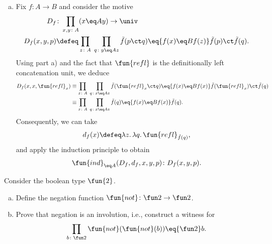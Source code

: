 \begin{solution}
\begin{enumerate}[a)]
        \item Fix $f\colon A\to B$ and consider the motive
        \begin{align*}
            D_f&\colon\prod_{x,y\colon A}(x\eq Ay)\to\univ\\
                D_f(x,y,p)&\defeq\prod_{z\colon A}\;\prod_{q\colon y\eq Az}
                \tilde f(p\ct q)\eq{f(x)\eq Bf(z)}
                    \tilde f(p)\ct\tilde f(q).
        \end{align*}
        Using part a) and the fact that $\fun{refl}$ is the  definitionally left concatenation unit, we deduce
        \begin{align*}
            D_f(x,x,\fun{refl}_x)
                &\equiv\prod_{z\colon A}\;\prod_{q\colon x\eq Az}
                    \tilde f(\fun{refl}_x\ct q)\eq{f(x)\eq Bf(x)}
                        \tilde f(\fun{refl}_x)\ct\tilde f(q)\\
                &\equiv \prod_{z\colon A}\;\prod_{q\colon x\eq Az}
                    \tilde f(q)\eq{f(x)\eq Bf(x)}\tilde f(q).
        \end{align*}
        Consequently, we can take
        \[
            d_f(x)\defeq\lambda z.\,\lambda q.\,\fun{refl}_{\tilde f(q)},
        \]
        and apply the induction principle to obtain
        \[
            \fun{ind}_{\eq A}(D_f,d_f,x,y,p)\colon D_f(x,y,p).
        \]\qedhere
    \end{enumerate}
\end{solution}

\begin{exr}\label{exr:not}
    Consider the boolean type\/ $\fun{2}$.
    \begin{enumerate}[a),font=\upshape]
        \item Define the negation function\/ $\fun{not}\colon\fun2\to\fun2$.
        \item Prove that negation is an involution, i.e., construct a witness for
        \[
            \prod_{b\colon\fun2}\fun{not}(\fun{not}(b))\eq{\fun2} b.
        \]
    \end{enumerate}
\end{exr}

